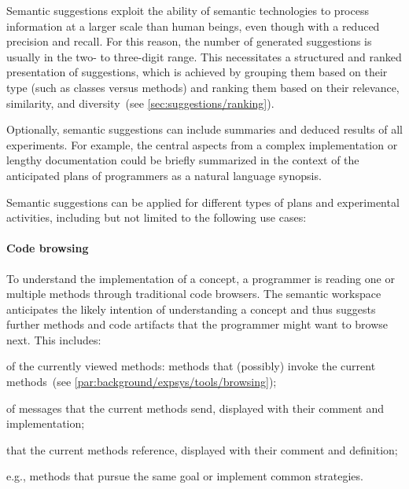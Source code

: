 Semantic suggestions exploit the ability of semantic technologies to process information at a larger scale than human beings, even though with a reduced precision and recall.
For this reason, the number of generated suggestions is usually in the two- to three-digit range.
This necessitates a structured and ranked presentation of suggestions, which is achieved by grouping them based on their type (such as classes versus methods) and ranking them based on their relevance, similarity, and diversity~(see \cref{sec:suggestions/ranking}).

Optionally, semantic suggestions can include summaries and deduced results of all experiments.
For example, the central aspects from a complex implementation or lengthy documentation could be briefly summarized in the context of the anticipated plans of programmers as a natural language synopsis.

Semantic suggestions can be applied for different types of plans and experimental activities, including but not limited to the following use cases:

	\paragraph{Code browsing}
	To understand the implementation of a concept, a programmer is reading one or multiple methods through traditional code browsers.
	The semantic workspace anticipates the likely intention of understanding a concept and thus suggests further methods and code artifacts that the programmer might want to browse next.
	This includes:

	\begin{description}[noextralabelsep]
		\item[senders] of the currently viewed methods: methods that (possibly) invoke the current methods~(see \cref{par:background/expsys/tools/browsing});
		\item[implementors] of messages that the current methods send, displayed with their comment and implementation;
		\item[classes] that the current methods reference, displayed with their comment and definition;
		\item[similar methods,] e.g., methods that pursue the same goal or implement common strategies.
	\end{description}

